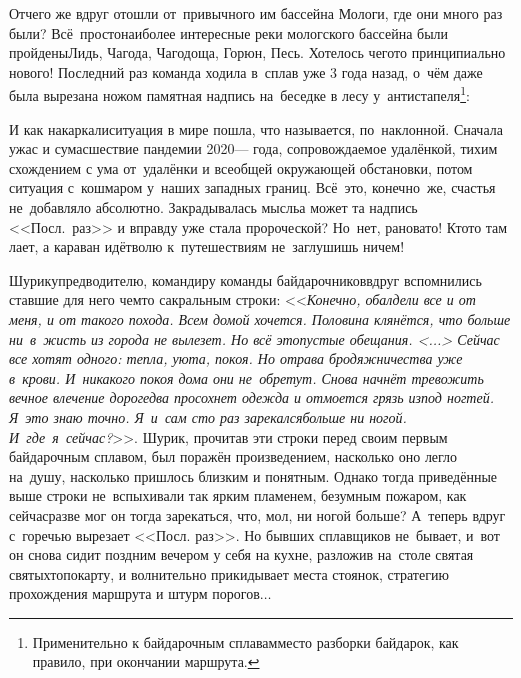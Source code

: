{{\renewcommand*{\thefootnote}{\fnsymbol{footnote}}
\setcounter{footnote}{0}
Отчего же вдруг отошли от~привычного им бассейна Мологи, где они много раз были? Всё~просто\mdash наиболее интересные реки мологского бассейна были пройдены\mdash Лидь, Чагода, Чагодоща, Горюн, Песь. Хотелось чего\sdash то принципиально нового! Последний раз команда ходила в~сплав уже 3 года назад, о~чём даже была вырезана ножом памятная надпись на~беседке в лесу у~антистапеля\footnote{Применительно к байдарочным сплавам\mdash место разборки байдарок, как правило, при окончании маршрута.}: %

\vspace{4mm}
{\centering\Huge{}}

\newpage
И как накаркали\mdash ситуация в мире пошла, что называется, по~наклонной. Сначала ужас и сумасшествие пандемии 2020\thinspace\nobreakdash--- года, сопровождаемое удалёнкой, тихим схождением с ума от~удалёнки и всеобщей окружающей обстановки, потом ситуация с~кошмаром у~наших западных границ. Всё~это, конечно~же, счастья не~добавляло абсолютно. Закрадывалась мысль\mdash а может та надпись <<Посл.~раз>> и вправду уже стала пророческой? Но~нет, рановато! Кто\sdash то там лает, а караван идёт\mdash волю к~путешествиям не~заглушишь ничем!

Шурику\mdash предводителю, командиру команды байдарочников\mdash вдруг вспомнились ставшие для него чем\sdash то сакральным строки: <<\textit{Конечно, обалдели все и от меня, и от такого похода. Всем домой хочется. Половина клянётся, что больше ни~в~жисть из города не вылезет. Но всё это\mdash пустые обещания. <...> Сейчас все хотят одного: тепла, уюта, покоя. Но отрава бродяжничества уже в~крови. И~никакого покоя дома они не~обретут. Снова начнёт тревожить вечное влечение дорог\mdash едва просохнет одежда и отмоется грязь из\sdash под ногтей. Я~это знаю точно. Я~и~сам сто раз зарекался\mdash больше ни ногой. И~где~я~сейчас?}>>\cite{ГеографГлобусПропил}. Шурик, прочитав эти строки перед своим первым байдарочным сплавом, был поражён произведением, насколько оно легло на~душу, насколько пришлось близким и понятным. Однако тогда приведённые выше строки не~вспыхивали так ярким пламенем, безумным пожаром, как сейчас\mdash разве мог он тогда зарекаться, что, мол, ни ногой больше? А~теперь вдруг с~горечью вырезает <<Посл. раз>>. Но бывших сплавщиков не~бывает, и~вот он снова сидит поздним вечером у себя на кухне, разложив на~столе святая святых\mdash топокарту, и волнительно прикидывает места стоянок, стратегию прохождения маршрута и штурм порогов$\ldots$ 

}}
